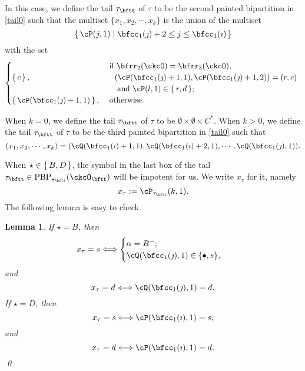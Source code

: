 \documentclass[12pt,a4paper]{amsart}
\numberwithin{equation}{section}
\newtheorem{lem}[thm]{Lemma}
\theoremstyle{remark}
\def\PBP{\mathrm{PBP}}
\begin{document}
\smallskip

 \smallskip






In this case, we define the tail $\tau_\bftt$ of $\tau$ to be the second painted bipartition in \eqref{tail0} such that the multiset $\{x_1, x_2, \cdots, x_k\}$ is the
union of the multiset
\[
\set{\cP(j,1)| \bfcc_{1}(\jmath)+2 \leq j \leq \bfcc_{1}(\imath)}
\]
with the set
\[
  \begin{cases}
  &
 \ \text{if $\bfrr_2(\ckcO)=\bfrr_3(\ckcO)$,}\\
 \set{c},& \quad \text{$(\cP(\bfcc_{1}(\jmath)+1,1) ,\cP(\bfcc_{1}(\jmath)+1,2)) = (r,c)$ }\\
 & \quad \text{ and $\cP(l,1)\in \set{r,d}$};  \\
\set{\cP(\bfcc_{1}(\jmath)+1,1)},&
\    \text{otherwise.}
\end{cases}
\]

 \smallskip

 \smallskip

When $k=0$, we define the tail $\tau_{\bftt}$ of $\tau$ to be
$\emptyset\times \emptyset \times C^{*}$.
When $k> 0$, we define the tail $\tau_\bftt$ of $\tau$ to be the third painted bipartition in \eqref{tail0} such that
\[
  (x_1, x_2, \cdots, x_k)= (\cQ(\bfcc_{1}(\imath)+1,1),\cQ(\bfcc_{1}(\imath)+2,1),\cdots, \cQ(\bfcc_{1}(\jmath),1)).
\]


 When $\star \in \set{B,D}$, the symbol in the last box of the tail $\tau_\bftt\in \PBP_{\star_\bftt}(\ckcO_\bftt)$ will be impotent for us. We write $x_\tau$ for it, namely
\[
x_\tau := \cP_{\tau_\bftt}(k,1).
\]
 The following lemma is easy to check.

\begin{lem}\label{tailtip}
If $\star=B$, then
\[
x_\tau=s\Longleftrightarrow
\begin{cases}
  \alpha=B^-;\\
  \cQ(\bfcc_{1}(\jmath),1) \in\{\bullet, s\},
  \end{cases}
\]
and
\[
x_\tau=d \Longleftrightarrow
\cQ(\bfcc_{1}(\jmath),1) =d.
\]
If $\star=D$, then
\[
x_\tau=s\Longleftrightarrow \cP(\bfcc_{1}(\imath),1) = s,
\]
and
\[
x_\tau=d\Longleftrightarrow \cP(\bfcc_{1}(\imath),1) =d.
\]
\qed
\end{lem}
\end{document}
